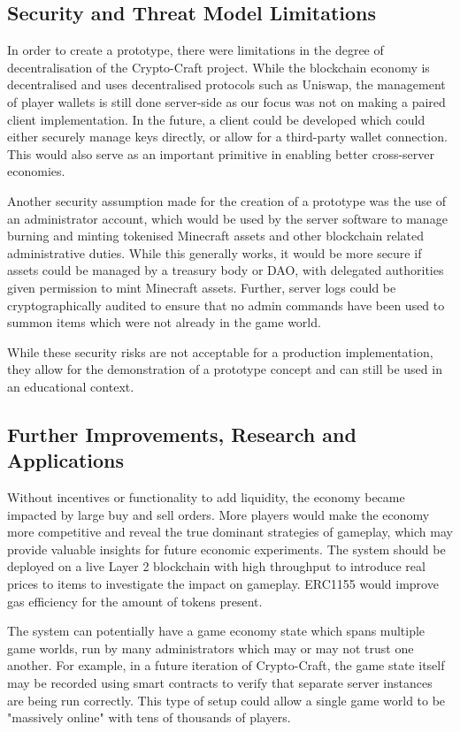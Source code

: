 \documentclass[conference]{IEEEtran}
\begin{document}
\subsection{Security and Threat Model Limitations}
In order to create a prototype, there were limitations in the degree of decentralisation of the Crypto-Craft project. While the blockchain economy is decentralised and uses decentralised protocols such as Uniswap, the management of player wallets is still done server-side as our focus was not on making a paired client implementation. In the future, a client could be developed which could either securely manage keys directly, or allow for a third-party wallet connection. This would also serve as an important primitive in enabling better cross-server economies.

Another security assumption made for the creation of a prototype was the use of an administrator account, which would be used by the server software to manage burning and minting tokenised Minecraft assets and other blockchain related administrative duties. While this generally works, it would be more secure if assets could be managed by a treasury body or DAO, with delegated authorities given permission to mint Minecraft assets. Further, server logs could be cryptographically audited to ensure that no admin commands have been used to summon items which were not already in the game world.

While these security risks are not acceptable for a production implementation, they allow for the demonstration of a prototype concept and can still be used in an educational context. 


\subsection{Further Improvements, Research and Applications}
Without incentives or functionality to add liquidity, the economy became impacted by large buy and sell orders. More players would make the economy more competitive and reveal the true dominant strategies of gameplay, which may provide valuable insights for future economic experiments. The system should be deployed on a live Layer 2 blockchain with high throughput to introduce real prices to items to investigate the impact on gameplay. ERC1155 would improve gas efficiency for the amount of tokens present. 

The system can potentially have a game economy state which spans multiple game worlds, run by many administrators which may or may not trust one another. For example, in a future iteration of Crypto-Craft, the game state itself may be recorded using smart contracts to verify that separate server instances are being run correctly. This type of setup could allow a single game world to be "massively online"\cite{evefrontiercontracts} with tens of thousands of players. 
\end{document}
